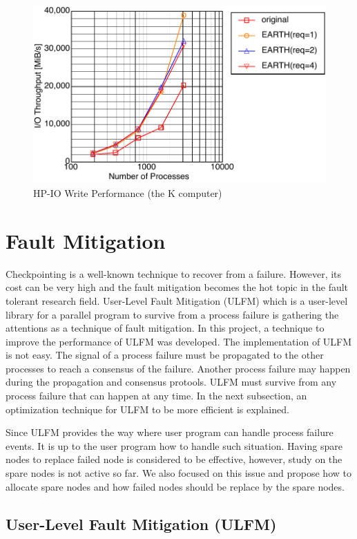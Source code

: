 \begin{figure}[ht]
\begin{center}
\includegraphics[width=0.8\columnwidth]{Figs/K-HPIO.pdf}
  \caption{HP-IO Write Performance (the K computer)}
  \label{fig:earth}
\end{center}
\end{figure}

\section{Fault Mitigation}

Checkpointing is a well-known technique to recover from a
failure. However, its cost can be very high and the fault mitigation
becomes the hot topic in the fault tolerant research field. User-Level
Fault Mitigation (ULFM) which is a user-level 
library for a parallel program to survive from a process failure is
gathering the attentions as a technique of fault mitigation. In this
project, a technique to improve the performance of ULFM was developed.
The implementation of ULFM is not easy. The signal of a process
failure must be propagated to the other processes to reach a consensus
of the failure. Another process failure may happen during the
propagation and consensus protools. ULFM must survive from any
process failure that can happen at any time. In the next subsection,
an optimization technique for ULFM to be more efficient is explained. 

Since ULFM provides the way where user program can handle process
failure events. It is up to the user program how to handle such
situation. Having spare nodes to replace failed node is considered to
be effective, however, study on the spare nodes is not active so far. We
also focused on this issue and propose how to allocate spare nodes and
how failed nodes should be replace by the spare nodes. 

\subsection{User-Level Fault Mitigation (ULFM)}

